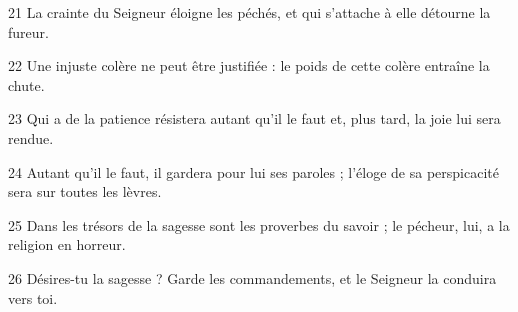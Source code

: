 
21 La crainte du Seigneur éloigne les péchés, et qui s’attache à elle détourne la fureur.

22 Une injuste colère ne peut être justifiée : le poids de cette colère entraîne la chute.

23 Qui a de la patience résistera autant qu’il le faut et, plus tard, la joie lui sera rendue.

24 Autant qu’il le faut, il gardera pour lui ses paroles ; l’éloge de sa perspicacité sera sur toutes les lèvres.

25 Dans les trésors de la sagesse sont les proverbes du savoir ; le pécheur, lui, a la religion en horreur.

26 Désires-tu la sagesse ? Garde les commandements, et le Seigneur la conduira vers toi.
